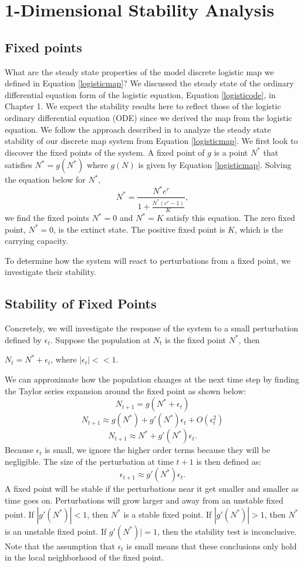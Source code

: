 \documentclass[12pt, openany]{book}
\theoremstyle{definition}
\theoremstyle{remark}
\numberwithin{equation}{chapter}
\numberwithin{figure}{chapter}
\begin{document}
\section{1-Dimensional Stability Analysis}

\subsection{Fixed points}
What are the steady state properties of the model discrete logistic map we defined in Equation \ref{logisticmap}? We discussed the steady state of the ordinary differential equation form of the logistic equation, Equation \ref{logisticode}, in Chapter 1. We expect the stability results here to reflect those of the logistic ordinary differential equation (ODE) since we derived the map from the logistic equation. We follow the approach described in \cite{strogatz1994nonlinear} to analyze the steady state stability of our discrete map system from Equation \ref{logisticmap}. We first look to discover the fixed points of the system. A fixed point of $g$ is a point $N^*$ that satisfies $N^* = g(N^*)$ where $g(N)$ is given by Equation \ref{logisticmap}. Solving the equation below for $N^*$,
\begin{equation}\label{15}
N^* = \frac{N^*e^{r}}{1 + \frac{N^*(e^{r}-1)}{K}},
\end{equation}
we find the fixed points $N^* = 0$ and $N^* = K$ satisfy this equation. The zero fixed point, $N^* = 0$, is the extinct state. The positive fixed point is $K$, which is the carrying capacity. 

To determine how the system will react to perturbations from a fixed point, we investigate their stability.

\subsection{Stability of Fixed Points}

Concretely, we will investigate the response of the system to a small perturbation defined by $\epsilon_t$. Suppose the population at $N_t$ is the fixed point $N^*$, then 
\begin{center}
$N_t = N^* + \epsilon_t$, where $|\epsilon_t| << 1$.
\end{center} 
We can approximate how the population changes at the next time step by finding the Taylor series expansion around the fixed point as shown below:
$$N_{t+1} = g(N^* + \epsilon_t)$$ 
$$N_{t+1} \approx g(N^*) + g'(N^*)\epsilon_t + O(\epsilon_t^2)$$ 
$$N_{t+1} \approx N^* + g'(N^*)\epsilon_t.$$
Because $\epsilon_t$ is small, we ignore the higher order terms because they will be negligible. The size of the perturbation at time $t+1$ is then defined as: 
$$\epsilon_{t+1} \approx g'(N^*)\epsilon_t.$$
A fixed point will be stable if the perturbations near it get smaller and smaller as time goes on. Perturbations will grow larger and away from an unstable fixed point. If $|g'(N^*)| < 1$, then $N^*$ is a stable fixed point. If $|g'(N^*)| > 1$, then $N^*$ is an unstable fixed point. If $g'(N^*)| = 1$, then the stability test is inconclusive. Note that the assumption that $\epsilon_t$ is small means that these conclusions only hold in the local neighborhood of the fixed point.
\end{document}
